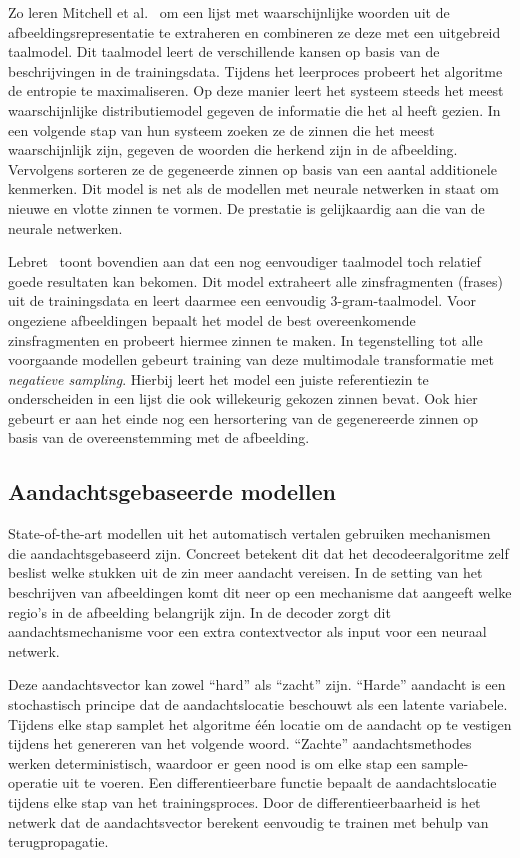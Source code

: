 Zo leren Mitchell et al.~\cite{Mitchell2015} om een lijst met waarschijnlijke woorden uit de afbeeldingsrepresentatie te extraheren en combineren ze deze met een uitgebreid taalmodel. Dit taalmodel leert de verschillende kansen op basis van de beschrijvingen in de trainingsdata. Tijdens het leerproces probeert het algoritme de entropie te maximaliseren. Op deze manier leert het systeem steeds het meest waarschijnlijke distributiemodel gegeven de informatie die het al heeft gezien. In een volgende stap van hun systeem zoeken ze de zinnen die het meest waarschijnlijk zijn, gegeven de woorden die herkend zijn in de afbeelding. Vervolgens sorteren ze de gegeneerde zinnen op basis van een aantal additionele kenmerken. Dit model is net als de modellen met neurale netwerken in staat om nieuwe en vlotte zinnen te vormen. De prestatie is gelijkaardig aan die van de neurale netwerken.

Lebret~\cite{Lebret2015} toont bovendien aan dat een nog eenvoudiger taalmodel toch relatief goede resultaten kan bekomen. Dit model extraheert alle zinsfragmenten (frases) uit de trainingsdata en leert daarmee een eenvoudig 3-gram-taalmodel. Voor ongeziene afbeeldingen bepaalt het model de best overeenkomende zinsfragmenten en probeert hiermee zinnen te maken. In tegenstelling tot alle voorgaande modellen gebeurt training van deze multimodale transformatie met \emph{negatieve sampling}. Hierbij leert het model een juiste referentiezin te onderscheiden in een lijst die ook willekeurig gekozen zinnen bevat. Ook hier gebeurt er aan het einde nog een hersortering van de gegenereerde zinnen op basis van de overeenstemming met de afbeelding.

\subsection{Aandachtsgebaseerde modellen}
State-of-the-art modellen uit het automatisch vertalen gebruiken mechanismen die aandachtsgebaseerd zijn. Concreet betekent dit dat het decodeeralgoritme zelf beslist welke stukken uit de zin meer aandacht vereisen.
In de setting van het beschrijven van afbeeldingen komt dit neer op een mechanisme dat aangeeft welke regio's in de afbeelding belangrijk zijn. In de decoder zorgt dit aandachtsmechanisme voor een extra contextvector als input voor een neuraal netwerk. 

Deze aandachtsvector kan zowel ``hard'' als ``zacht'' zijn. ``Harde'' aandacht is een stochastisch principe dat de aandachtslocatie beschouwt als een latente variabele. Tijdens elke stap samplet het algoritme \'e\'en locatie om de aandacht op te vestigen tijdens het genereren van het volgende woord. ``Zachte'' aandachtsmethodes werken deterministisch, waardoor er geen nood is om elke stap een sample-operatie uit te voeren. Een differentieerbare functie bepaalt de aandachtslocatie tijdens elke stap van het trainingsproces. Door de differentieerbaarheid is het netwerk dat de aandachtsvector berekent eenvoudig te trainen met behulp van terugpropagatie.

